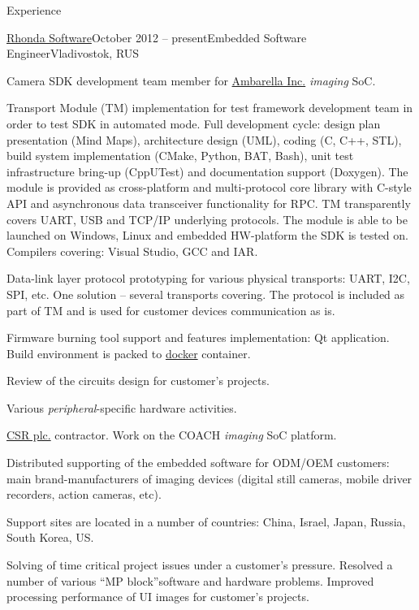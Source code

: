\documentclass{template}
\begin{document}

\begin{rSection}{Experience}
\begin{rCompany}{\href{http://www.rhondasoftware.com}{Rhonda Software}}{October 2012 -- present}{Embedded Software Engineer}{Vladivostok, RUS}
\item Camera SDK development team member for \href{http://www.ambarella.com}{Ambarella Inc.} \textit{imaging} SoC.
\item Transport Module (TM) implementation for test framework development team in order to test SDK in automated mode. Full development cycle: design plan presentation (Mind Maps), architecture design (UML), coding (C, C++, STL), build system implementation (CMake, Python, BAT, Bash), unit test infrastructure bring-up (CppUTest) and documentation support (Doxygen). The module is provided as cross-platform and multi-protocol core library with C-style API and asynchronous data transceiver functionality for RPC. TM transparently covers UART, USB and TCP/IP underlying protocols. The module is able to be launched on Windows, Linux and embedded HW-platform the SDK is tested on. Compilers covering: Visual Studio, GCC and IAR.
\item Data-link layer protocol prototyping for various physical transports: UART, I2C, SPI, etc. One solution -- several transports covering. The protocol is included as part of TM and is used for customer devices communication as is.
\item Firmware burning tool support and features implementation: Qt application. Build environment is packed to \href{www.docker.com}{docker} container.
\item Review of the circuits design for customer's projects.
\item Various \textit{peripheral}-specific hardware activities. \newline
\item \href{http://www.csr.com}{CSR plc.} contractor. Work on the COACH \textit{imaging} SoC platform.
\item Distributed supporting of the embedded software for ODM/OEM customers: main brand-manufacturers of imaging devices (digital still cameras, mobile driver recorders, action cameras, etc).
\item Support sites are located in a number of countries: China, Israel, Japan, Russia, South Korea, US.
\item Solving of time critical project issues under a customer's pressure. Resolved a number of various \textquotedblleft MP block\textquotedblright software and hardware problems. Improved processing performance of UI images for customer's projects.

\end{rCompany}
\end{rSection}
\end{document}
